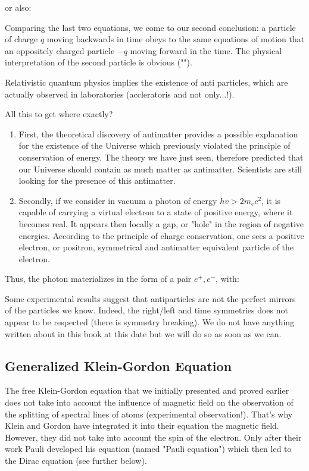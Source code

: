 	or also:
	
	Comparing the last two equations, we come to our second conclusion: a particle of charge $q$ moving backwards in time obeys to the same equations of  motion that an oppositely charged particle $-q$ moving forward in the time. The physical interpretation of the second particle is obvious ("").

	Relativistic quantum physics implies the existence of anti particles, which are actually observed in laboratories (accleratoris and not only...!).

	All this to get where exactly?
	\begin{enumerate}
		\item First, the theoretical discovery of antimatter provides a possible explanation for the existence of the Universe which previously violated the principle of conservation of energy. The theory we have just seen, therefore predicted that our Universe should contain as much matter as antimatter. Scientists are still looking for the presence of this antimatter.

		\item Secondly, if we consider in vacuum a photon of energy $hv>2m_ec^2$, it is capable of carrying a virtual electron to a state of positive energy, where it becomes real. It appears then locally a gap, or "hole" in the region of negative energies. According to the principle of charge conservation, one sees a positive electron, or positron, symmetrical and antimatter equivalent particle of the electron.
	\end{enumerate}
	Thus, the photon materializes in the form of a pair $e^+,e^{-}$, with:
	
	\begin{tcolorbox}[title=Remark,colframe=black,arc=10pt]
	Some experimental results suggest that antiparticles are not the perfect mirrors of the particles we know. Indeed, the right/left and time symmetries does not appear to be respected (there is symmetry breaking). We do not have anything written about in this book at this date but we will do so as soon as we can.
	\end{tcolorbox}
	
	\subsection{Generalized Klein-Gordon Equation}
	The free Klein-Gordon equation that we initially presented and proved earlier does not take into account the influence of magnetic field on the observation of the splitting of spectral lines of atoms (experimental observation!). That's why Klein and Gordon have integrated it into their equation the magnetic field. However, they did not take into account the spin of the electron. Only after their work Pauli developed his equation (named "Pauli equation") which then led to the Dirac equation (see further below).

